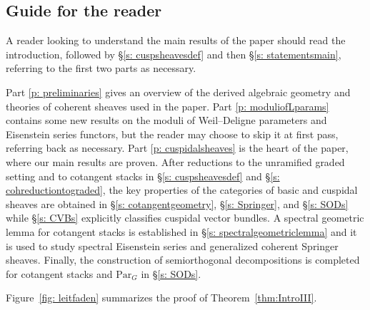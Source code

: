 \documentclass{amsart}
\theoremstyle{definition}
\theoremstyle{remark}
\numberwithin{equation}{section}
\newcommand{\Par}{\mathrm{Par}}
\begin{document}
\subsection{Guide for the reader}
A reader looking to understand the main results of the paper should read the introduction, followed by \S \ref{s: cuspsheavesdef} and then \S \ref{s: statementsmain}, referring to the first two parts as necessary. 

Part \ref{p: preliminaries} gives an overview of the derived algebraic geometry and theories of coherent sheaves used in the paper. Part \ref{p: moduliofLparams} contains some new results on the moduli of Weil--Deligne parameters and Eisenstein series functors, but the reader may choose to skip it at first pass, referring back as necessary. Part \ref{p: cuspidalsheaves} is the heart of the paper, where our main results are proven. After reductions to the unramified graded setting and to cotangent stacks in \S \ref{s: cuspsheavesdef} and \S \ref{s: cohreductiontograded}, the key properties of the categories of basic and cuspidal sheaves are obtained in \S \ref{s: cotangentgeometry}, \S \ref{s: Springer}, and \S \ref{s: SODs} while \S \ref{s: CVBs} explicitly classifies cuspidal vector bundles.  A spectral geometric lemma for cotangent stacks is established in \S \ref{s: spectralgeometriclemma} and it is used to study spectral Eisenstein series and generalized coherent Springer sheaves. Finally, the construction of semiorthogonal decompositions is completed for cotangent stacks and $\Par_G$ in \S \ref{s: SODs}.

Figure~\ref{fig: leitfaden} summarizes the proof of Theorem~\ref{thm:IntroIII}.
 
\end{document}
